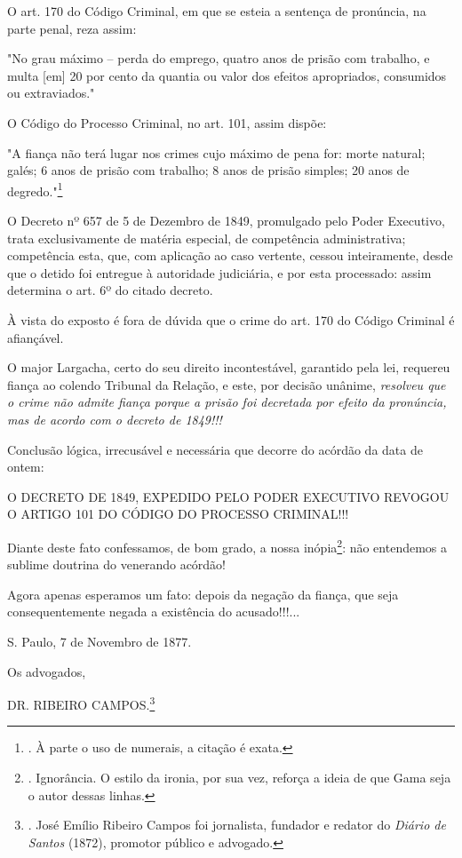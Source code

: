 O art. 170 do Código Criminal, em que se esteia a sentença de pronúncia,
na parte penal, reza assim:

"No grau máximo -- perda do emprego, quatro anos de prisão com trabalho,
e multa {[}em{]} 20 por cento da quantia ou valor dos efeitos
apropriados, consumidos ou extraviados."

O Código do Processo Criminal, no art. 101, assim dispõe:

"A fiança não terá lugar nos crimes cujo máximo de pena for: morte
natural; galés; 6 anos de prisão com trabalho; 8 anos de prisão simples;
20 anos de degredo."\footnote{. À parte o uso de numerais, a citação é
  exata.}

O Decreto nº 657 de 5 de Dezembro de 1849, promulgado pelo Poder
Executivo, trata exclusivamente de matéria especial, de competência
administrativa; competência esta, que, com aplicação ao caso vertente,
cessou inteiramente, desde que o detido foi entregue à autoridade
judiciária, e por esta processado: assim determina o art. 6º do citado
decreto.

À vista do exposto é fora de dúvida que o crime do art. 170 do Código
Criminal é afiançável.

O major Largacha, certo do seu direito incontestável, garantido pela
lei, requereu fiança ao colendo Tribunal da Relação, e este, por decisão
unânime, \emph{resolveu que o crime não admite fiança porque a prisão
foi decretada por efeito da pronúncia, mas de acordo com o decreto de
1849!!!}

Conclusão lógica, irrecusável e necessária que decorre do acórdão da
data de ontem:

O DECRETO DE 1849, EXPEDIDO PELO PODER EXECUTIVO REVOGOU O ARTIGO 101 DO
CÓDIGO DO PROCESSO CRIMINAL!!!

Diante deste fato confessamos, de bom grado, a nossa inópia\footnote{.
  Ignorância. O estilo da ironia, por sua vez, reforça a ideia de que
  Gama seja o autor dessas linhas.}: não entendemos a sublime doutrina
do venerando acórdão!

Agora apenas esperamos um fato: depois da negação da fiança, que seja
consequentemente negada a existência do acusado!!!...

S. Paulo, 7 de Novembro de 1877.

Os advogados,

DR. RIBEIRO CAMPOS.\footnote{. José Emílio Ribeiro Campos foi
  jornalista, fundador e redator do \emph{Diário de Santos} (1872),
  promotor público e advogado.}

